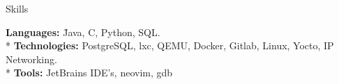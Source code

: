 \documentclass{article}
\newlength{\tabin}
\newlength{\secsep}
\newcommand{\lineunder}{\vspace*{-8pt} \\ \hspace*{-6pt} \hrulefill \\ \vspace*{-15pt}}
\newenvironment{tabbedsection}[1]{
	\begin{list}{}{
			\setlength{\itemsep}{0pt}
			\setlength{\labelsep}{0pt}
			\setlength{\labelwidth}{0pt}
			\setlength{\leftmargin}{0pt}
			\setlength{\rightmargin}{\tabin}
			\setlength{\listparindent}{0pt}
			\setlength{\parsep}{0pt}
			\setlength{\parskip}{0pt}
			\setlength{\partopsep}{0pt}
			\setlength{\topsep}{#1}
		}
		\item[]
	}{\end{list}}
\newenvironment{nospacetabbing}{
	\begin{tabbing}
	}{\end{tabbing}\vspace{-1.2em}}
\newenvironment{resume_section}[1]{
	\filbreak
	\vspace{2\secsep}
	\textsc{\color{blue}\large#1}
	\lineunder
	\begin{tabbedsection}{\secsep}
	}{\end{tabbedsection}}
\begin{document}
	\begin{resume_section}{Skills}
	\begin{nospacetabbing}
		\textbf{Languages:} \hspace{5em} \=Java, C, Python, SQL.\\*
		\textbf{Technologies:} \> PostgreSQL, lxc, QEMU, Docker, Gitlab, Linux, Yocto, IP Networking.\\*
		\textbf{Tools:} \> JetBrains IDE's, neovim, gdb
	\end{nospacetabbing}
	\end{resume_section}
	
\end{document}
